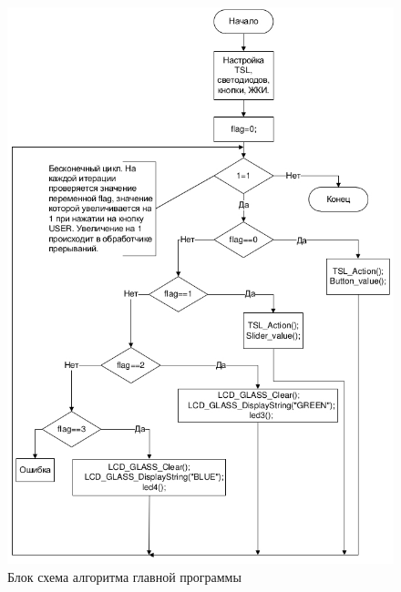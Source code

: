 \begin{figure}[H]
\begin{center}
\includegraphics[scale=0.7]{Image/89.jpg} 
\end{center}
\caption{Блок схема алгоритма главной программы}
\end{figure}

